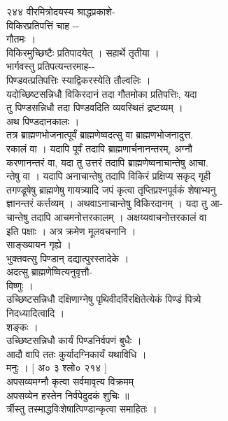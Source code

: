 \documentclass[11pt, openany]{book}
\begin{document}
{{{{२४४ वीरमित्रोदयस्य श्राद्धप्रकाशे-}{\\
विकिरप्रतिपत्तिं चाह -\/-\\
गौतमः ।\\
विकिरमुच्छिष्टैः प्रतिपादयेत् }{। }{सहार्थे तृतीया ।\\
भार्गवस्तु प्रतिपत्यन्तरमाह-\/-\\
पिण्डवत्प्रतिपत्तिः स्याद्विकरस्येति तौल्वलिः ।\\
यदोच्छिष्टसन्निधौ विकिरदानं तदा गौतमोका प्रतिपत्तिः, यदा\\
तु पिण्डसन्निधौ तदा पिण्डवदिति व्यवस्थितं द्रष्टव्यम् ।\\
अथ पिण्डदानकालः ।\\
तत्र ब्राह्मणभोजनात्पूर्वं ब्राह्मणेष्वदत्सु वा ब्राह्मणभोजनादुत्त.\\
रकालं वा । यदापि पूर्वं तदापि ब्राह्मणार्चनानन्तरम्, अग्नौ\\
करणानन्तरं वा, यदा तु उत्तरं तदापि ब्राह्मणेष्वनाचान्तेषु आचा.\\
न्तेषु वा । यदापि अनाचान्तेषु तदापि विकिरं प्रक्षिप्य सकृद् गृही\\
तगण्डूषेषु ब्राह्मणेषु गायत्र्यादि जपं कृत्वा तृप्तिप्रश्नपूर्वकं
शेषाभ्यनु\\
ज्ञानन्तरं कर्त्तव्यम् । अथवाऽनाचान्तेषु विकिरदानम् । यदा तु आ-\\
चान्तेषु तदापि आचमनोत्तरकालम् }{।}{ अक्षय्यवाचनोत्तरकालं वा\\
इति पक्षाः । अत्र क्रमेण मूलवचनानि ।\\
साङ्ख्यायन गृह्ये }{।}{\\
भुक्तवत्सु पिण्डान् दद्यात्पुरस्तादेके ।\\
अदत्सु ब्राह्मणेष्वित्यनुवृत्तौ-\\
विष्णुः ।\\
उच्छिष्टसन्निधौ दक्षिणाग्नेषु पृथिवीदर्विरक्षितेत्येकं पिण्डं पित्र्ये\\
निदध्यादित्वादि ।\\
शङ्कः ।\\
उच्छिष्टसन्निधौ कार्यं पिण्डनिर्वपणं बुधैः ।\\
आदौ वापि ततः कुर्यादग्निकार्यं यथाविधि ।\\
मनुः । {[} अ० ३ श्लो० २१४ {]}\\
अपसव्यमग्नौ कृत्वा सर्वमावृत्य विक्रमम् \textbar{}\\
अपसव्येन हस्तेन निर्वपेदुदकं शुचिः ॥\\
र्त्रीस्तु तस्माद्धविःशेषात्पिण्डान्कृत्वा समाहितः ।\\
[ अ० ३ श्लो० २१५ ]

}}}}
\end{document}
